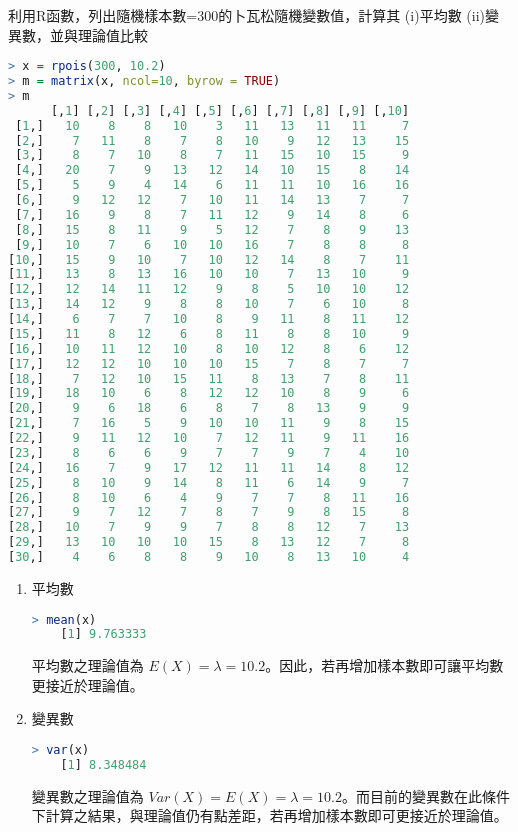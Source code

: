 利用R函數，列出隨機樣本數=300的卜瓦松隨機變數值，計算其 (i)平均數  (ii)變異數，並與理論值比較

\begin{lstlisting}[language=R]
> x = rpois(300, 10.2)
> m = matrix(x, ncol=10, byrow = TRUE)
> m
      [,1] [,2] [,3] [,4] [,5] [,6] [,7] [,8] [,9] [,10]
 [1,]   10    8    8   10    3   11   13   11   11     7
 [2,]    7   11    8    7    8   10    9   12   13    15
 [3,]    8    7   10    8    7   11   15   10   15     9
 [4,]   20    7    9   13   12   14   10   15    8    14
 [5,]    5    9    4   14    6   11   11   10   16    16
 [6,]    9   12   12    7   10   11   14   13    7     7
 [7,]   16    9    8    7   11   12    9   14    8     6
 [8,]   15    8   11    9    5   12    7    8    9    13
 [9,]   10    7    6   10   10   16    7    8    8     8
[10,]   15    9   10    7   10   12   14    8    7    11
[11,]   13    8   13   16   10   10    7   13   10     9
[12,]   12   14   11   12    9    8    5   10   10    12
[13,]   14   12    9    8    8   10    7    6   10     8
[14,]    6    7    7   10    8    9   11    8   11    12
[15,]   11    8   12    6    8   11    8    8   10     9
[16,]   10   11   12   10    8   10   12    8    6    12
[17,]   12   12   10   10   10   15    7    8    7     7
[18,]    7   12   10   15   11    8   13    7    8    11
[19,]   18   10    6    8   12   12   10    8    9     6
[20,]    9    6   18    6    8    7    8   13    9     9
[21,]    7   16    5    9   10   10   11    9    8    15
[22,]    9   11   12   10    7   12   11    9   11    16
[23,]    8    6    6    9    7    7    9    7    4    10
[24,]   16    7    9   17   12   11   11   14    8    12
[25,]    8   10    9   14    8   11    6   14    9     7
[26,]    8   10    6    4    9    7    7    8   11    16
[27,]    9    7   12    7    8    7    9    8   15     8
[28,]   10    7    9    9    7    8    8   12    7    13
[29,]   13   10   10   10   15    8   13   12    7     8
[30,]    4    6    8    8    9   10    8   13   10     4
\end{lstlisting}

\begin{enumerate}
    \item 平均數
    \begin{lstlisting}[language=R]
    > mean(x)
    [1] 9.763333
    \end{lstlisting}
    平均數之理論值為 $E(X) = \lambda = 10.2$。因此，若再增加樣本數即可讓平均數更接近於理論值。
    
    \item 變異數
    \begin{lstlisting}[language=R]
    > var(x)
    [1] 8.348484
    \end{lstlisting}
    變異數之理論值為 $Var(X) = E(X) = \lambda = 10.2$。而目前的變異數在此條件下計算之結果，與理論值仍有點差距，若再增加樣本數即可更接近於理論值。
    
\end{enumerate}